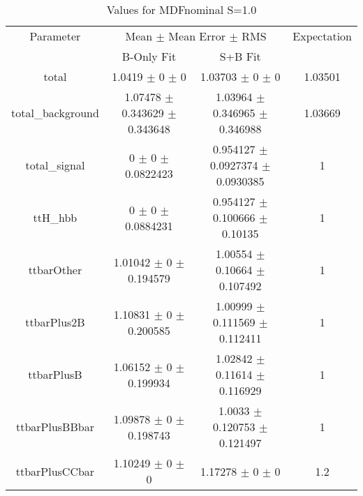 \begin{table}
\centering
\caption{Values for MDFnominal S=1.0}
\begin{tabular}{cccc}
\toprule
Parameter & \multicolumn{2}{c}{Mean $\pm$ Mean Error $\pm$ RMS} & Expectation\\
 & B-Only Fit & S+B Fit & \\
\midrule
total & \num{1.0419} $\pm$ \num{0} $\pm$ \num{0} & \num{1.03703} $\pm$ \num{0} $\pm$ \num{0} & \num{1.03501}\\
total\_background & \num{1.07478} $\pm$ \num{0.343629} $\pm$ \num{0.343648} & \num{1.03964} $\pm$ \num{0.346965} $\pm$ \num{0.346988} & \num{1.03669}\\
total\_signal & \num{0} $\pm$ \num{0} $\pm$ \num{0.0822423} & \num{0.954127} $\pm$ \num{0.0927374} $\pm$ \num{0.0930385} & \num{1}\\
ttH\_hbb & \num{0} $\pm$ \num{0} $\pm$ \num{0.0884231} & \num{0.954127} $\pm$ \num{0.100666} $\pm$ \num{0.10135} & \num{1}\\
ttbarOther & \num{1.01042} $\pm$ \num{0} $\pm$ \num{0.194579} & \num{1.00554} $\pm$ \num{0.10664} $\pm$ \num{0.107492} & \num{1}\\
ttbarPlus2B & \num{1.10831} $\pm$ \num{0} $\pm$ \num{0.200585} & \num{1.00999} $\pm$ \num{0.111569} $\pm$ \num{0.112411} & \num{1}\\
ttbarPlusB & \num{1.06152} $\pm$ \num{0} $\pm$ \num{0.199934} & \num{1.02842} $\pm$ \num{0.11614} $\pm$ \num{0.116929} & \num{1}\\
ttbarPlusBBbar & \num{1.09878} $\pm$ \num{0} $\pm$ \num{0.198743} & \num{1.0033} $\pm$ \num{0.120753} $\pm$ \num{0.121497} & \num{1}\\
ttbarPlusCCbar & \num{1.10249} $\pm$ \num{0} $\pm$ \num{0} & \num{1.17278} $\pm$ \num{0} $\pm$ \num{0} & \num{1.2}\\
\bottomrule
\end{tabular}
\end{table}